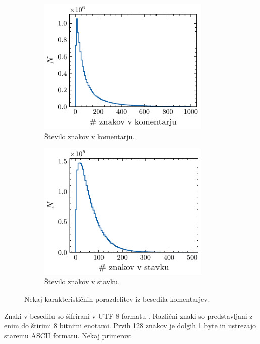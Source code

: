 \documentclass[11pt, oneside]{article}
\theoremstyle{definition}
\begin{document}
\begin{figure}[h!]
\begin{subfigure}[b]{0.49\textwidth}
        \centering
        \includegraphics[width=0.9\textwidth]{char_comment_counts.pdf}
        \caption{Število znakov v komentarju.}
        \label{fig: w3}
    \end{subfigure}
    \hfill
    \begin{subfigure}[b]{0.49\textwidth}
        \centering
        \includegraphics[width=0.9\textwidth]{sent_word_count.pdf}
        \caption{Število znakov v stavku.}
        \label{fig: w4}
    \end{subfigure}
    \caption{Nekaj karakterističnih porazdelitev iz besedila komentarjev.}
    \label{fig: w}
\end{figure}

\newpage
Znaki v besedilu so šifrirani v UTF-8 formatu \cite{wiki_utf8}. Različni znaki so predstavljani z enim do štirimi 8 bitnimi enotami.
Prvih 128 znakov je dolgih 1 byte in ustrezajo staremu ASCII formatu. Nekaj primerov:
\end{document}
